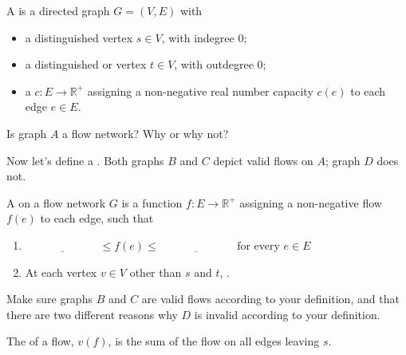 \documentclass{tufte-handout}
\begin{document}
\newcommand{\R}{\mathbb{R}}

\pause
\begin{defn}
  A  is a directed graph $G = (V,E)$ with
  \begin{itemize}
  \item a distinguished  vertex $s \in V$, with indegree 0;
  \item a distinguished  or  vertex $t \in V$,
    with outdegree 0;
  \item a  $c : E \to \R^+$ assigning a
    non-negative real number capacity $c(e)$ to each edge $e \in E$.
  \end{itemize}
\end{defn}

\begin{questions}
  \item Is graph $A$ a flow network?  Why or why not?
\end{questions}

Now let's define a .  Both graphs $B$ and $C$ depict valid
flows on $A$; graph $D$ does not.

\begin{defn}
  A  on a flow network $G$ is a function $f : E \to \R^+$
  assigning a non-negative flow $f(e)$ to each edge, such that
  \begin{enumerate}
  \item $\underline{\phantom{XXXXXXXX}} \leq f(e) \leq
    \underline{\phantom{XXXXXXXX}}$ for every $e \in E$
  \item At each vertex $v \in V$ other than $s$ and $t$, \blank
    \newline \blank.
  \end{enumerate}

  Make sure graphs $B$ and $C$ are valid flows according to your
  definition, and that there are two different reasons why $D$ is
  invalid according to your definition.
\end{defn}

\begin{defn}
  The  of a flow, $v(f)$, is the sum of the flow on all
  edges leaving $s$.
\end{defn}
\end{document}
